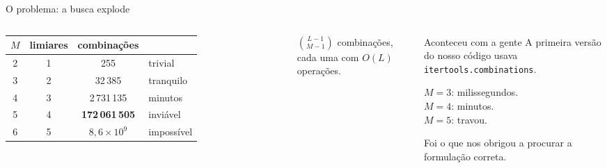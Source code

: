 \documentclass[aspectratio=169,12pt]{beamer}
\newcommand{\sub}[1]{{\small\textcolor{cinza}{#1}}}
\begin{document}
\begin{frame}{O problema: a busca explode}

  \begin{columns}[c,onlytextwidth]
      \footnotesize
      \begin{tabular}{@{}cccl@{}}
        \toprule
        $M$ & limiares & combinações & \\
        \midrule
        2 & 1 & 255 & trivial \\
        3 & 2 & 32\,385 & tranquilo \\
        4 & 3 & 2\,731\,135 & minutos \\
        5 & 4 & \textbf{172\,061\,505} & \textcolor{cMulti}{inviável} \\
        6 & 5 & $8{,}6\times10^{9}$ & impossível \\
        \bottomrule
      \end{tabular}

      \vspace{.8em}
      \normalsize
      $\displaystyle \binom{L-1}{M-1}$ combinações, cada uma com $O(L)$
      operações.

      \begin{block}{Aconteceu com a gente}
        A primeira versão do nosso código usava
        \texttt{itertools.combinations}.

        \vspace{.5em}
        $M=3$: milissegundos. \\
        $M=4$: minutos. \\
        $M=5$: \alert{travou}.

        \vspace{.5em}
        \sub{Foi o que nos obrigou a procurar a formulação correta.}
      \end{block}
  \end{columns}

\end{frame}
\end{document}
